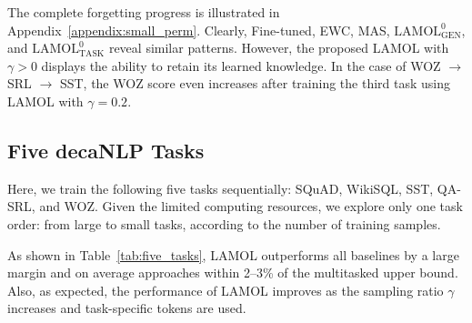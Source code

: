 \documentclass{article} %
\begin{document}




The complete forgetting progress is illustrated in Appendix~\ref{appendix:small_perm}.
Clearly, Fine-tuned, EWC, MAS, $\text{LAMOL}_{\text{GEN}}^0$, and $\text{LAMOL}_{\text{TASK}}^0$ reveal similar patterns.
However, the proposed LAMOL with $\gamma > 0$ displays the ability to retain its learned knowledge.
In the case of 
WOZ $\rightarrow$ SRL $\rightarrow$ SST,  %
the WOZ score even increases after training the third task using LAMOL with $\gamma = 0.2$.




\subsection{Five decaNLP Tasks}
Here, we train the following five tasks sequentially: SQuAD, WikiSQL, SST, QA-SRL, and WOZ.
Given the limited computing resources, we explore only one task order: from large to small tasks, according to the number of training samples.

As shown in Table~\ref{tab:five_tasks}, LAMOL outperforms all baselines by a large margin and on average approaches within 2--3\% of the multitasked upper bound.
Also, as expected, the performance of LAMOL improves as the sampling ratio $\gamma$ increases and task-specific tokens are used.
\end{document}
